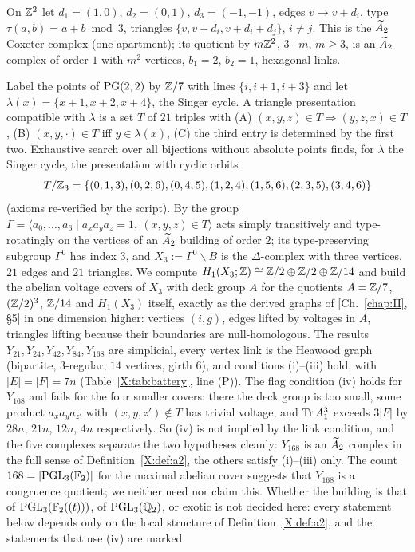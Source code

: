 \begin{construction}\label{X:con:thin}
On $\mathbb{Z}^{2}$ let $d_1=(1,0)$, $d_2=(0,1)$, $d_3=(-1,-1)$, edges $v\to v+d_i$, type
$\tau(a,b)=a+b\bmod3$, triangles $\{v,v+d_i,v+d_i+d_j\}$, $i\neq j$. This is the
$\widetilde A_2$ Coxeter complex (one apartment); its quotient by $m\mathbb{Z}^{2}$, $3\mid m$, $m\ge3$, is an
$\widetilde A_2$ complex of order $1$ with $m^{2}$ vertices, $b_1=2$, $b_2=1$, hexagonal links.
\end{construction}

\begin{construction}\label{X:con:thick}
Label the points of $\mathrm{PG}(2,2)$ by $\mathbb{Z}/7$ with lines $\{i,i+1,i+3\}$ and let
$\lambda(x)=\{x+1,x+2,x+4\}$, the Singer cycle. A triangle presentation compatible with
$\lambda$ \cite{CMSZ} is a set $T$ of $21$ triples with (A) $(x,y,z)\in T\Rightarrow
(y,z,x)\in T$, (B) $(x,y,\cdot)\in T$ iff $y\in\lambda(x)$, (C) the third entry is
determined by the first two. Exhaustive search over all bijections without absolute points
finds, for $\lambda$ the Singer cycle, the presentation with cyclic orbits
\[
T/\mathbb{Z}_3=\{(0,1,3),(0,2,6),(0,4,5),(1,2,4),(1,5,6),(2,3,5),(3,4,6)\}
\]
(axioms re-verified by the script). By \cite{CMSZ} the group
$\Gamma=\langle a_0,\dots,a_6\mid a_xa_ya_z=1,\ (x,y,z)\in T\rangle$ acts simply
transitively and type-rotatingly on the vertices of an $\widetilde A_2$ building of order $2$; its
type-preserving subgroup $\Gamma^{0}$ has index $3$, and $X_3:=\Gamma^{0}\backslash B$ is
the $\Delta$-complex with three vertices, $21$ edges and $21$ triangles. We compute
$H_1(X_3;\mathbb{Z})\cong\mathbb{Z}/2\oplus\mathbb{Z}/2\oplus\mathbb{Z}/14$ and build the abelian voltage covers of $X_3$
with deck group $A$ for the quotients $A=\mathbb{Z}/7$, $(\mathbb{Z}/2)^{3}$, $\mathbb{Z}/14$ and $H_1(X_3)$
itself, exactly as the derived graphs of [Ch.~\ref{chap:II}, \S5] in one dimension higher: vertices
$(i,g)$, edges lifted by voltages in $A$, triangles lifting because their boundaries are
null-homologous. The results $Y_{21},Y_{24},Y_{42},Y_{84},Y_{168}$ are simplicial, every
vertex link is the Heawood graph (bipartite, $3$-regular, $14$ vertices, girth $6$), and
conditions (i)--(iii) hold, with $|E|=|F|=7n$ (Table~\ref{X:tab:battery}, line (P)). The flag
condition (iv) holds for $Y_{168}$ and fails for the four smaller covers: there the deck
group is too small, some product $a_xa_ya_{z'}$ with $(x,y,z')\notin T$ has trivial voltage,
and $\operatorname{Tr} A_1^{3}$ exceeds $3|F|$ by $28n$, $21n$, $12n$, $4n$ respectively. So (iv) is not
implied by the link condition, and the five complexes separate the two hypotheses cleanly:
$Y_{168}$ is an $\widetilde A_2$ complex in the full sense of Definition~\ref{X:def:a2}, the others
satisfy (i)--(iii) only. The count $168=|\mathrm{PGL}_3(\mathbb{F}_2)|$ for the maximal abelian cover
suggests that $Y_{168}$ is a congruence quotient; we neither need nor claim this. Whether the
building is that of $\mathrm{PGL}_3(\mathbb{F}_2((t)))$, of $\mathrm{PGL}_3(\mathbb{Q}_2)$, or exotic is not decided here:
every statement below depends only on the local structure of Definition~\ref{X:def:a2}, and
the statements that use (iv) are marked.
\end{construction}


